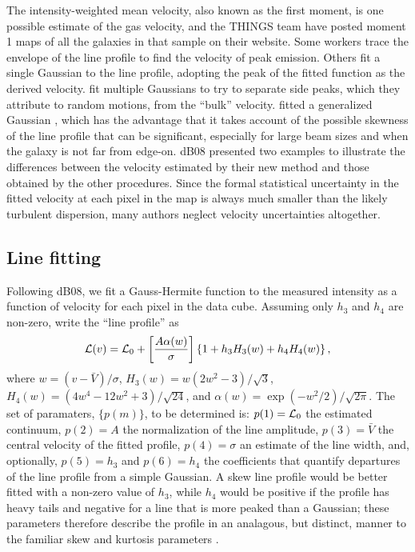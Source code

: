 \documentclass[letterpaper,fleqn,usenatbib]{mnras}
\def\eg{{\it e.g.}}
\begin{document}
The intensity-weighted mean velocity, also known as the first moment,
is one possible estimate of the gas velocity, and the THINGS team
\citep{Wa08} have posted moment 1 maps of all the galaxies in that
sample on their website.  Some workers \citep[\eg][]{Ge04} trace the
envelope of the line profile to find the velocity of peak emission.
Others \citep[\eg][]{Po16} fit a single Gaussian to the line profile,
adopting the peak of the fitted function as the derived velocity.
\citet{Oh08, Oh19} fit multiple Gaussians to try to separate side
peaks, which they attribute to random motions, from the ``bulk''
velocity.  \citet[][hereafter dB08]{deB08} fitted a generalized
Gaussian \citep{Ge93, vdMF93}, which has the advantage that it takes
account of the possible skewness of the line profile that can be
significant, especially for large beam sizes and when the galaxy is
not far from edge-on.  dB08 presented two examples to illustrate the
differences between the velocity estimated by their new method and
those obtained by the other procedures.  Since the formal statistical
uncertainty in the fitted velocity at each pixel in the map is always
much smaller than the likely turbulent dispersion, many authors
neglect velocity uncertainties altogether.

\subsection{Line fitting}
Following dB08, we fit a Gauss-Hermite function to the measured
intensity as a function of velocity for each pixel in the data cube.
Assuming only $h_3$ and $h_4$ are non-zero, \citet[][ their
  eq.~(9)]{vdMF93} write the ``line profile'' as
\begin{equation}
{\cal L}(v) = {\cal L}_0 + \left[ {A\alpha(w) \over \sigma} \right] \left\{ 1 + h_3H_3(w) + h_4H_4(w) \right\},
\label{eq.profile}
\end{equation} 
where $w= (v-\bar V) / \sigma$, $H_3(w) = w(2w^2-3)/\sqrt{3}$, $H_4(w)
= (4w^4 - 12w^2 + 3)/\sqrt{24}$, and $\alpha(w) =
\exp(-w^2/2)/\sqrt{2\pi}$.  The set of paramaters, $\{p(m)\}$, to be
determined is: $p(1) = {\cal L}_0$ the estimated continuum, $p(2) = A$
the normalization of the line amplitude, $p(3) = \bar V$ the central
velocity of the fitted profile, $p(4) = \sigma$ an estimate of the
line width, and, optionally, $p(5) = h_3$ and $p(6) = h_4$ the
coefficients that quantify departures of the line profile from a
simple Gaussian.  A skew line profile would be better fitted with a
non-zero value of $h_3$, while $h_4$ would be positive if the profile
has heavy tails and negative for a line that is more peaked than a
Gaussian; these parameters therefore describe the profile in an
analagous, but distinct, manner to the familiar skew and kurtosis
parameters \citep[\eg][]{Press92}.
\end{document}
